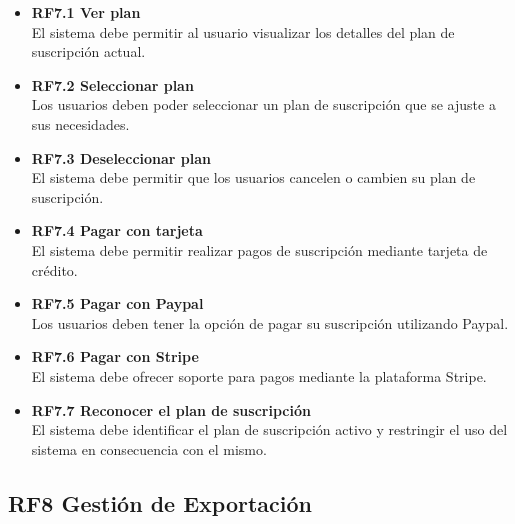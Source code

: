 \documentclass[12pt.a4paper]{article}
\begin{document}
\begin{itemize}
    \item \textbf{RF7.1 Ver plan} \\
    El sistema debe permitir al usuario visualizar los detalles del plan de suscripción actual.

    \item \textbf{RF7.2 Seleccionar plan} \\
    Los usuarios deben poder seleccionar un plan de suscripción que se ajuste a sus necesidades.

    \item \textbf{RF7.3 Deseleccionar plan} \\
    El sistema debe permitir que los usuarios cancelen o cambien su plan de suscripción.

    \item \textbf{RF7.4 Pagar con tarjeta} \\
    El sistema debe permitir realizar pagos de suscripción mediante tarjeta de crédito.

    \item \textbf{RF7.5 Pagar con Paypal} \\
    Los usuarios deben tener la opción de pagar su suscripción utilizando Paypal.

    \item \textbf{RF7.6 Pagar con Stripe} \\
    El sistema debe ofrecer soporte para pagos mediante la plataforma Stripe.

    \item \textbf{RF7.7 Reconocer el plan de suscripción} \\
    El sistema debe identificar el plan de suscripción activo y restringir el uso del sistema en consecuencia con el mismo.
\end{itemize}

\subsection*{RF8 Gestión de Exportación}
\end{document}
